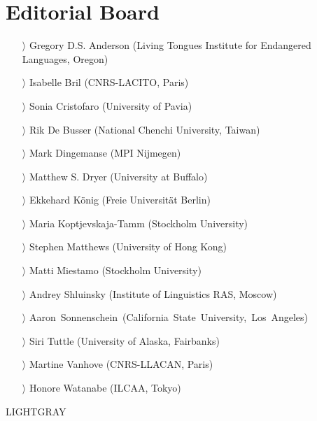 \documentclass[
notumble,
nofoldmark,
]{leaflet}
\begin{document}
{    \section{Editorial Board}
    \begin{itemize}
    \item[$\rangle$] Gregory D.S. Anderson (Living Tongues Institute for Endangered Languages, Oregon)
    \item[$\rangle$] Isabelle Bril (CNRS-LACITO, Paris)
    \item[$\rangle$] Sonia Cristofaro (University of Pavia)
    \item[$\rangle$] Rik De Busser (National Chenchi University, Taiwan)
    \item[$\rangle$] Mark Dingemanse (MPI Nijmegen)
    \item[$\rangle$] Matthew S. Dryer (University at Buffalo)
    \item[$\rangle$] Ekkehard K\"onig (Freie Universit\"at Berlin)
    \item[$\rangle$] Maria Koptjevskaja-Tamm (Stockholm University)
    \item[$\rangle$] Stephen Matthews (University of Hong Kong)
    \item[$\rangle$] Matti Miestamo (Stockholm University)
    \item[$\rangle$] Andrey Shluinsky (Institute of Linguistics RAS, Moscow)
    \item[$\rangle$] \mbox{Aaron Sonnenschein (California State University, Los Angeles)}
    \item[$\rangle$] Siri Tuttle (University of Alaska, Fairbanks)
    \item[$\rangle$] Martine Vanhove (CNRS-LLACAN, Paris)
    \item[$\rangle$] Honore Watanabe (ILCAA, Tokyo)
    \end{itemize}    
}{LIGHTGRAY}
\end{document}
